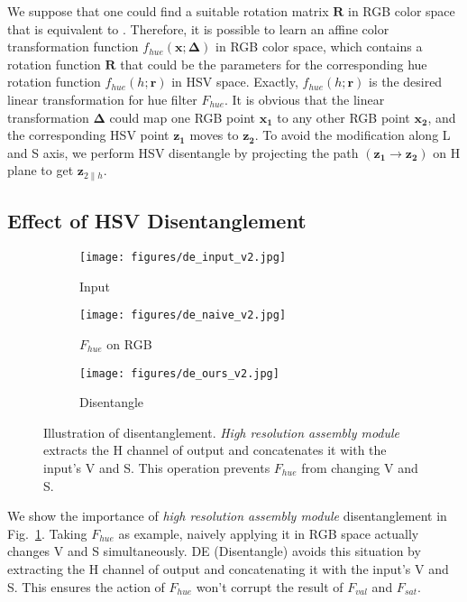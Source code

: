 \documentclass[runningheads]{llncs}
\begin{document}
   
   
   We suppose that one could find a suitable rotation matrix $\bm{R}$ in RGB color space that is equivalent to \cite{haeberli1993matrix}.
   Therefore, it is possible to learn an affine color transformation function $f_{hue}(\bm{x}; \bm{\Delta})$ in RGB color space, which contains a rotation function $\bm{R}$ that could be the parameters for the corresponding hue rotation function $f_{hue}(h; \bm{r})$ in HSV space.
   Exactly, $f_{hue}(h; \bm{r})$ is the desired linear transformation for hue filter $F_{hue}$.
   It is obvious that the linear transformation $\bm{\Delta}$ could map one RGB point $\bm{x_1}$ to any other RGB point $\bm{x_2}$, and the corresponding HSV point $\bm{z_1}$ moves to $\bm{z_2}$.
   To avoid the modification along L and S axis, we perform HSV disentangle by projecting the path $(\bm{z_1} \rightarrow \bm{z_2})$ on H plane to get $\bm{z}_{2\parallel h}$.
   
   
   \subsection{Effect of HSV Disentanglement}
   \label{disentangle}
   
   \begin{figure}[htbp]
   \centering
   
   \begin{subfigure}[t]{0.3\linewidth}
   \centering
   \texttt{[image: figures/de\_input\_v2.jpg]}
   \caption{Input}
   \end{subfigure}
   \begin{subfigure}[t]{0.3\linewidth}
   \centering
   \texttt{[image: figures/de\_naive\_v2.jpg]}
   \caption{$F_{hue}$ on RGB}
   \end{subfigure}
   \begin{subfigure}[t]{0.3\linewidth}
   \centering
   \texttt{[image: figures/de\_ours\_v2.jpg]}
   \caption{Disentangle}
   \end{subfigure}
   
   \caption{Illustration of disentanglement.
   \textit{High resolution assembly module} extracts the H channel of output and concatenates it with the input's V and S. This operation prevents $F_{hue}$ from changing V and S.
   }
   \label{fig:disentangle}
   \end{figure}
   
   We show the importance of \textit{high resolution assembly module} disentanglement in Fig.~\ref{fig:disentangle}.
   Taking $F_{hue}$ as example, naively applying it in RGB space actually changes V and S simultaneously. 
   DE (Disentangle) avoids this situation by extracting the H channel of output and concatenating it with the input's V and S. This ensures the action of $F_{hue}$ won't corrupt the result of $F_{val}$ and $F_{sat}$.
   
\end{document}
